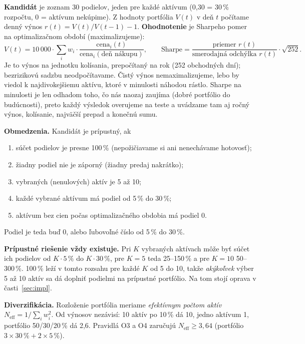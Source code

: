 \documentclass[10pt,a4paper]{article}
\begin{document}
\textbf{Kandidát} je zoznam 30 podielov, jeden pre každé aktívum (0,30 = 30\,\% rozpočtu, 0 = aktívum nekúpime).
Z hodnoty portfólia $V(t)$ v deň $t$ počítame denný výnos $r(t)=V(t)/V(t-1)-1$.
\textbf{Ohodnotenie} je Sharpeho pomer na optimalizačnom období (maximalizujeme):
\[
  V(t)=10\,000\cdot\sum_{i}w_i\cdot\frac{\text{cena}_i(t)}{\text{cena}_i(\text{deň nákupu})},
  \qquad
  \text{Sharpe}=\frac{\text{priemer } r(t)}{\text{smerodajná odchýlka } r(t)}\cdot\sqrt{252}.
\]
Je to výnos na jednotku kolísania, prepočítaný na rok (252 obchodných dní); bezrizikovú sadzbu neodpočítavame.
Čistý výnos nemaximalizujeme, lebo by viedol k najdivokejšiemu aktívu, ktoré v minulosti náhodou rástlo.
Sharpe na minulosti je len odhadom toho, čo nás naozaj zaujíma (dobré portfólio do budúcnosti), preto
každý výsledok overujeme na teste a uvádzame tam aj ročný výnos, kolísanie, najväčší prepad a konečnú sumu.

\textbf{Obmedzenia.} Kandidát je prípustný, ak
\begin{enumerate}[label=(O\arabic*)]
\item súčet podielov je presne 100\,\% (nepožičiavame si ani nenechávame hotovosť);
\item žiadny podiel nie je záporný (žiadny predaj nakrátko);
\item vybraných (nenulových) aktív je 5 až 10;
\item každé vybrané aktívum má podiel od 5\,\% do 30\,\%;
\item aktívum bez cien počas optimalizačného obdobia má podiel 0.
\end{enumerate}
Podiel je teda buď 0, alebo ľubovoľné číslo od 5\,\% do 30\,\%.

\textbf{Prípustné riešenie vždy existuje.} Pri $K$ vybraných aktívach môže byť súčet ich podielov od
$K\cdot5\,\%$ do $K\cdot30\,\%$, pre $K=5$ teda 25--150\,\% a pre $K=10$ 50--300\,\%. 100\,\% leží v tomto
rozsahu pre každé $K$ od 5 do 10, takže \emph{akýkoľvek} výber 5 až 10 aktív sa dá doplniť podielmi na
prípustné portfólio. Na tom stojí oprava v časti~\ref{sec:impl}.

\textbf{Diverzifikácia.} Rozloženie portfólia meriame \emph{efektívnym počtom aktív}
$N_\text{eff}=1/\sum_i w_i^2$. Od výnosov nezávisí: 10 aktív po 10\,\% dá 10, jedno aktívum 1,
portfólio 50/30/20\,\% dá 2,6. Pravidlá O3 a O4 zaručujú $N_\text{eff}\ge3{,}64$ (portfólio $3\times30\,\%+2\times5\,\%$).
\end{document}
